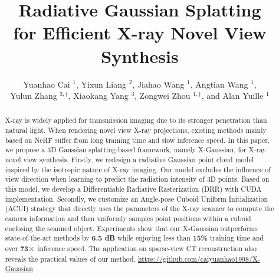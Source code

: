 \documentclass[runningheads]{llncs}
\begin{document}
\title{Radiative Gaussian Splatting \\ for Efficient X-ray Novel View Synthesis} 


\author{Yuanhao Cai $^{1}$, Yixun Liang $^{2}$, Jiahao Wang $^{1}$, Angtian Wang $^{1}$, \\  Yulun Zhang $^{3,\dagger}$, Xiaokang Yang $^3$, Zongwei Zhou $^{1,\dagger}$, and Alan Yuille $^{1}$ \\
}
%
\vspace{-2mm}

\maketitle

\vspace{-4mm}
\begin{abstract}
X-ray is widely applied for transmission imaging due to its stronger penetration than natural light. When rendering novel view X-ray projections, existing methods mainly based on NeRF suffer from long training time and slow inference speed. In this paper, we propose a 3D Gaussian splatting-based framework, namely X-Gaussian, for X-ray novel view synthesis. Firstly, we redesign a radiative Gaussian point cloud model inspired by the isotropic nature of X-ray imaging. Our model excludes the influence of view direction when learning to predict the radiation intensity of 3D points. Based on this model, we develop a Differentiable Radiative Rasterization (DRR) with CUDA implementation. Secondly, we customize an Angle-pose Cuboid Uniform Initialization (ACUI) strategy that directly uses the parameters of the X-ray scanner to compute the camera information and then uniformly samples point positions within a cuboid enclosing the scanned object. Experiments show that our X-Gaussian outperforms state-of-the-art methods by \textbf{6.5 dB} while enjoying less than \textbf{15\%} training time and over \textbf{73$\bf \times$} inference speed. The application on sparse-view CT reconstruction also reveals the practical values of our method. \url{https://github.com/caiyuanhao1998/X-Gaussian}
	
\end{abstract}

\vspace{-1mm}
\let\thefootnote\relax{}
\end{document}
